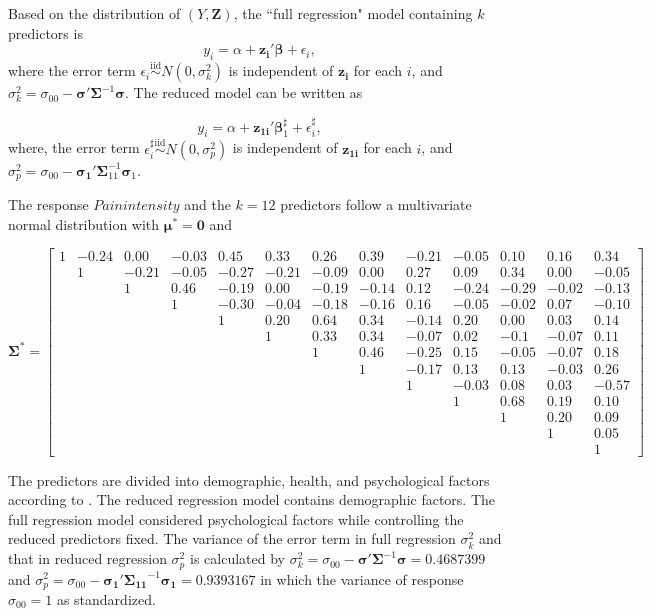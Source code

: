 \documentclass[11pt]{article}
\begin{document}
Based on the distribution of $(Y, \boldsymbol{Z})$, the ``full regression" model containing $k$ predictors is  
$$
y_i = \alpha + \boldsymbol{z_i}'\boldsymbol{\beta} + \epsilon_i,
$$
where the error term $\epsilon_i \overset{\mathrm{iid}}{\sim} N(0, \sigma^2_k)$ is independent of $\boldsymbol{z_i}$ for each $i$, 
and $\sigma^2_k = \sigma_{00} - \boldsymbol{\sigma}' \boldsymbol{\Sigma}^{-1} \boldsymbol{\sigma}$. The reduced model can be written as

$$
y_i = \alpha + \boldsymbol{z_{1i}}'\boldsymbol{\beta}_1^\sharp + \epsilon_i^\sharp,
$$
where, the error term $\epsilon_i^\sharp \overset{\mathrm{iid}}{\sim} N(0, \sigma^2_p)$ is independent of $\boldsymbol{z_{1i}}$ for each $i$, and $\sigma^2_p = \sigma_{00} - \boldsymbol{\sigma_1}' \boldsymbol{\Sigma}_{11}^{-1} \boldsymbol{\sigma}_1$. 

The response $Pain  intensity$ and the $k = 12$ predictors follow a multivariate normal distribution with $\bm{\mu}^* = \boldsymbol{0}$ and

\scriptsize{
$$
\bm{\Sigma}^* =
\left[\begin{array}{ccccccccccccc}
  1&   -0.24& 0.00 &-0.03& 0.45 &0.33 &0.26& 0.39 &-0.21& -0.05& 0.10& 0.16 &0.34\\
  &1 &-0.21& -0.05 &-0.27 &-0.21& -0.09& 0.00 &0.27& 0.09 &0.34& 0.00 &-0.05 \\
  & & 1&0.46& -0.19& 0.00& -0.19 &-0.14 &0.12& -0.24 &-0.29& -0.02& -0.13\\
  & & & 1&-0.30& -0.04 &-0.18& -0.16& 0.16 &-0.05& -0.02& 0.07& -0.10 \\
  & & & & 1&0.20& 0.64 &0.34 &-0.14& 0.20& 0.00 &0.03& 0.14 \\
  & & & & & 1&0.33 &0.34& -0.07 &0.02& -0.1& -0.07& 0.11\\
  & & & & & & 1& 0.46& -0.25 &0.15& -0.05 &-0.07 &0.18\\
  & & & & & & & 1&-0.17& 0.13& 0.13 &-0.03& 0.26\\
  & & & & & & & & 1& -0.03 &0.08 &0.03 &-0.57\\
  & & & & & & & & & 1&0.68 &0.19& 0.10\\
  & & & & & & & & & & 1&0.20 &0.09\\
  & & & & & & & & & & & 1& 0.05\\
 & & & & & & & & & & & &1
 \end{array}\right]
 $$
 }
 \normalsize
 
 
 
 
The predictors are divided into demographic, health, and psychological factors according to \cite{baker2008chronicpain}. The reduced regression model contains demographic factors. The full regression model considered psychological factors while controlling the reduced predictors fixed. The variance of the error term in full regression $\sigma_k^2$ and that in reduced regression $\sigma_p^2$ is calculated by $\sigma^2_k = \sigma_{00} - \boldsymbol{\sigma}' \boldsymbol{\Sigma}^{-1} \boldsymbol{\sigma} = 0.4687399$ and $\sigma^2_p = \sigma_{00} - \boldsymbol{\sigma_1}' \boldsymbol{\Sigma_{11}}^{-1} \boldsymbol{\sigma_1} = 0.9393167$ in which the variance of response $\sigma_{00} = 1$ as standardized. 
\end{document}
